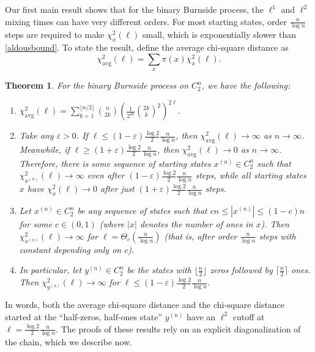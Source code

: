 \documentclass[11pt]{article}
\newcounter{r}
\newcounter{s}
\numberwithin{equation}{section}
\newtheorem{theorem}{Theorem}[section]
\begin{document}
Our first main result shows that for the binary Burnside process, the $\ell^1$ and $\ell^2$ mixing times can have very different orders. For most starting states, order $\frac{n}{\log n}$ steps are required to make $\chi_x^2(\ell)$ small, which is exponentially slower than \cref{aldousbound}. To state the result, define the average chi-square distance as
\[
    \chi_{\text{avg}}^2(\ell) = \sum_x \pi(x) \chi_x^2(\ell).
\]  
\begin{theorem}\label{chisquare}
For the binary Burnside process on $C_2^n$, we have the following:
\begin{enumerate}
    \item $\displaystyle\chi_{\text{avg}}^2(\ell) = \sum_{k=1}^{\lfloor n/2 \rfloor} \binom{n}{2k} \left(\frac{1}{2^{4k}} \binom{2k}{k}^2\right)^{2\ell}$.
    \item Take any $\varepsilon > 0$. If $\ell \le (1-\varepsilon) \frac{\log 2}{2} \frac{n}{\log n}$, then $\chi_{\text{avg}}^2(\ell) \to \infty$ as $n \to \infty$. Meanwhile, if $\ell \ge (1+\varepsilon)\frac{\log 2}{2} \frac{n}{\log n}$, then $\chi_{\text{avg}}^2(\ell) \to 0$ as $n \to \infty$. Therefore, there is some sequence of starting states $x^{(n)} \in C_2^n$ such that $\chi_{x^{(n)}}^2(\ell) \to \infty$ even after $(1 - \varepsilon)\frac{\log 2}{2} \frac{n}{\log n}$ steps, while all starting states $x$ have $\chi_x^2(\ell) \to 0$ after just $(1 + \varepsilon)\frac{\log 2}{2} \frac{n}{\log n}$ steps. 
    \item Let $x^{(n)} \in C_2^n$ be any sequence of states such that $cn \le |x^{(n)}| \le (1 - c)n$ for some $c \in (0, 1)$ (where $|x|$ denotes the number of ones in $x$). Then $\chi_{x^{(n)}}^2(\ell) \to \infty$ for $\ell = \Theta_c\left(\frac{n}{\log n}\right)$ (that is, after order $\frac{n}{\log n}$ steps with constant depending only on $c$). 
    \item In particular, let $y^{(n)} \in C_2^n$ be the states with $\lfloor \frac{n}{2} \rfloor$ zeros followed by $\lceil \frac{n}{2} \rceil$ ones. Then $\chi_{y^{(n)}}^2(\ell) \to \infty$ for $\ell \le (1-\varepsilon) \frac{\log 2}{2} \frac{n}{\log n}$.
\end{enumerate}
\end{theorem}

In words, both the average chi-square distance and the chi-square distance started at the ``half-zeros, half-ones state'' $y^{(n)}$ have an $\ell^2$ cutoff at $\ell = \frac{\log 2}{2} \frac{n}{\log n}$. The proofs of these results rely on an explicit diagonalization of the chain, which we describe now.
\end{document}
